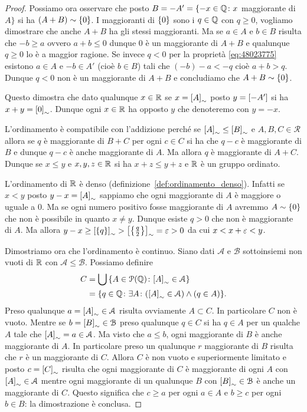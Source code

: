 \begin{proof}
  Possiamo ora osservare che posto $B=-A' = \{-x\in {\mathbb Q} \colon x$ maggiorante di $A\}$
  si ha $(A+B)\sim{\left\{ 0 \right\}}$. 
  I maggioranti di ${\left\{ 0 \right\}}$ sono i $q\in {\mathbb Q}$ con $q\ge 0$, 
  vogliamo dimostrare che anche $A+B$ ha gli stessi maggioranti.
  Ma se $a\in A$ e $b\in B$ risulta che $-b\ge a$ ovvero $a+b\le 0$ 
  dunque $0$ è un maggiorante di $A+B$ e qualunque $q\ge 0$ lo è a maggior ragione.
  Se invece $q<0$ per la proprietà \eqref{eq:48023775} esistono $a\in A$ 
  e $-b\in A'$ (cioè $b\in B$) tali che $(-b)-a<-q$ cioè $a+b>q$. Dunque 
  $q<0$ non è un maggiorante di $A+B$ e concludiamo che $A+B\sim{\left\{ 0 \right\}}$.
  
  Questo dimostra che dato qualunque $x\in {\mathbb R}$ se $x={\left[ A \right]}_\sim$
  posto $y={\left[ -A' \right]}$ si ha $x+y={\left[ 0 \right]}_\sim$.
  Dunque ogni $x\in {\mathbb R}$ ha opposto $y$ che denoteremo 
  con $y=-x$.

  L'ordinamento è compatibile con l'addizione perché se ${\left[ A \right]}_\sim 
  \le {\left[ B \right]}_\sim$ e $A,B,C\in \mathcal R$ 
  allora se $q$ è maggiorante di $B+C$ per ogni $c\in C$ si ha che $q-c$ 
  è maggiorante di $B$ e dunque $q-c$ è anche maggiorante di $A$.
  Ma allora $q$ è maggiorante di $A+C$. Dunque se $x\le y$ e $x,y,z\in {\mathbb R}$ 
  si ha $x+z\le y+z$ e ${\mathbb R}$ è un gruppo ordinato.
  
  L'ordinamento di ${\mathbb R}$ è denso (definizione~\ref{def:ordinamento_denso}). 
  Infatti se $x<y$ posto $y-x={\left[ A \right]}_\sim$ 
  sappiamo che ogni maggiorante di $A$ è maggiore o uguale a $0$.
  Ma se ogni numero positivo fosse maggiorante di $A$ avremmo $A\sim{\left\{ 0 \right\}}$
  che non è possibile in quanto $x\neq y$. Dunque esiste $q>0$ 
  che non è maggiorante di $A$. 
  Ma allora $y-x \ge {\left[ {\left\{ q \right\}} \right]}_\sim > {\left[ {\left\{ \frac q 2 \right\}} \right]}_\sim = \varepsilon > 0$
  da cui $x<x+\varepsilon<y$.
  
  Dimostriamo ora che l'ordinamento è continuo.
  Siano dati $\mathcal A$ e $\mathcal B$ sottoinsiemi non vuoti di ${\mathbb R}$ 
  con $\mathcal A\le \mathcal B$. 
  Possiamo definire
  \begin{align*}
    C & = \bigcup{\left\{ A\in \mathcal P({\mathbb Q})\colon {\left[ A \right]}_\sim \in \mathcal A \right\}} \\
      &= {\left\{ q\in {\mathbb Q}\colon \exists A\colon 
      ({\left[ A \right]}_\sim \in \mathcal A) \land (q\in A) \right\}}.
  \end{align*}
  Preso qualunque $a={\left[ A \right]}_\sim \in \mathcal A$ risulta 
  ovviamente $A\subset C$. In particolare $C$ non è vuoto.
  Mentre se $b={\left[ B \right]}_\sim \in \mathcal B$ 
  preso qualunque $q\in C$ si ha $q\in A$ per un qualche $A$ tale che 
  ${\left[ A \right]}_\sim = a\in \mathcal A$.
  Ma visto che $a\le b$, ogni maggiorante di $B$ è anche maggiorante di $A$.
  In particolare preso un qualunque $r$ maggiorante di $B$
  risulta che $r$ è un maggiorante di $C$.
  Allora $C$ è non vuoto e superiormente limitato 
  e posto $c={\left[ C \right]}_\sim$ 
  risulta che ogni maggiorante di $C$ è maggiorante di 
  ogni $A$ con ${\left[ A \right]}_\sim \in \mathcal A$ mentre 
  ogni maggiorante di un qualunque $B$ con ${\left[ B \right]}_\sim\in \mathcal B$ 
  è anche un maggiorante di $C$.
  Questo significa che $c\ge a$ per ogni $a\in A$ 
  e $b\ge c$ per ogni $b\in B$: la dimostrazione è conclusa.
\end{proof}


